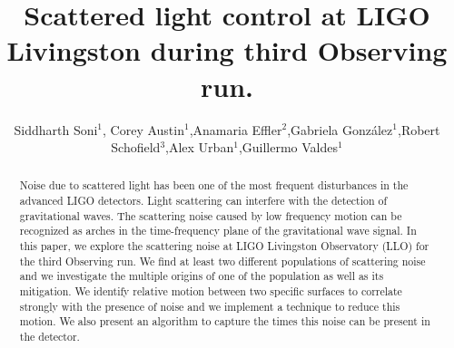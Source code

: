 \documentclass[12pt]{iopart}
\begin{document}



\title{Scattered light control at LIGO Livingston during third Observing run.}





\author{Siddharth Soni$^1$, Corey Austin$^1$,Anamaria Effler$^2$,Gabriela Gonz\'alez$^1$,Robert Schofield$^3$,Alex Urban$^1$,Guillermo Valdes$^1$}\address{$^1$ Department of Physics and Astronomy, Louisiana State University,Baton Rouge, LA, 70803,USA}\address{$^2$ LIGO Livingston Observatory, Livingston, LA 70754, USA}\address{$^3$ Department of Physics, University of Oregon, Eugene, OR 97403, USA}
\begin{abstract}

Noise due to scattered light has been one of the most frequent disturbances in the advanced LIGO detectors. Light scattering can interfere with the detection of gravitational waves. The scattering noise caused by low frequency motion can be recognized as arches in the time-frequency plane of the gravitational wave signal. In this paper, we explore the scattering noise at LIGO Livingston Observatory (LLO) for the third Observing run. We find at least two different populations of scattering noise and we investigate the multiple origins of one of the population as well as its mitigation. We identify relative motion between two specific surfaces to correlate strongly with the presence of noise and we implement a technique to reduce this motion.  We also present an algorithm to capture the times this noise can be present in the detector. 


\end{abstract}
\end{document}
